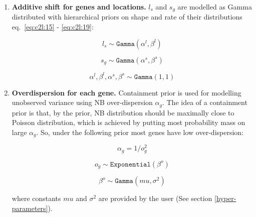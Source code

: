 \documentclass[11pt,a4paper]{article}
\begin{document}
\begin{enumerate}
    \item \textbf{Additive shift for genes and locations.} $l_s$ and $s_{g}$ are modelled as Gamma distributed with hierarchical priors on shape and rate of their distributions eq.~\eqref{eq:c2l:15} - \eqref{eq:c2l:19}:
    \begin{linenomath*} \begin{equation} \label{eq:c2l:15}
    l_s \sim \mathtt{Gamma}(\alpha^l,  \beta^l)
    \end{equation} \end{linenomath*}
    \begin{linenomath*} \begin{equation} \label{eq:c2l:18}
    s_{g} \sim \mathtt{Gamma}(\alpha^s,  \beta^s)
    \end{equation} \end{linenomath*}
    \begin{linenomath*} \begin{equation} \label{eq:c2l:19}
    \alpha^l, \beta^l, \alpha^s, \beta^s \sim \mathtt{Gamma}(1, 1)
    \end{equation} \end{linenomath*}
    
    \item \textbf{Overdispersion for each gene.} Containment prior \autocite{simpson_penalising_2017} is used for modelling unobserved variance using NB over-dispersion $\alpha_g$. The idea of a containment prior is that, by the prior, NB distribution should be maximally close to Poisson distribution, which is achieved by putting most probability mass on large $\alpha_g$. So, under the following prior most genes have low over-dispersion:
    \begin{linenomath*} \begin{equation} \label{eq:c2l:21}
    \alpha_g = 1 / o_g ^ 2
    \end{equation} \end{linenomath*}
    \begin{linenomath*} \begin{equation} \label{eq:c2l:22}
    o_g \sim \mathtt{Exponential}(\beta^o)
    \end{equation} \end{linenomath*}
    \begin{linenomath*} \begin{equation} \label{eq:c2l:23}
    \beta^o \sim \mathtt{Gamma}(mu, \sigma^2)
    \end{equation} \end{linenomath*}
    where constants $mu$ and $\sigma^2$ are provided by the user (See section \ref{hyper-parameters}).

\end{enumerate}
\end{document}
